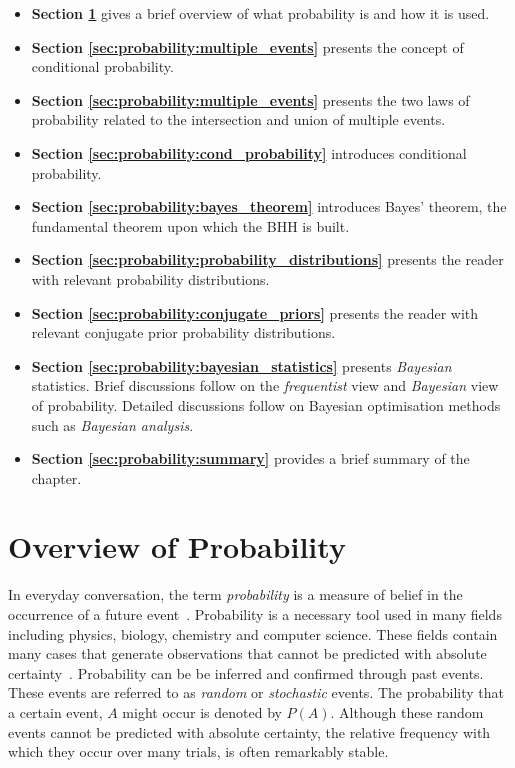 \begin{itemize}
      \item \textbf{Section \ref{sec:probability:overview}} gives a brief overview of what probability is and how it is used.

      \item \textbf{Section \ref{sec:probability:multiple_events}} presents the concept of conditional probability.

      \item \textbf{Section \ref{sec:probability:multiple_events}} presents the two laws of probability related to the intersection and union of multiple events.

      \item \textbf{Section \ref{sec:probability:cond_probability}} introduces conditional probability.

      \item \textbf{Section \ref{sec:probability:bayes_theorem}} introduces Bayes' theorem, the fundamental theorem upon which the \acs{BHH} is built.

      \item \textbf{Section \ref{sec:probability:probability_distributions}} presents the reader with relevant probability distributions.

      \item \textbf{Section \ref{sec:probability:conjugate_priors}} presents the reader with relevant conjugate prior probability distributions.

      \item \textbf{Section \ref{sec:probability:bayesian_statistics}} presents \textit{Bayesian} statistics. Brief discussions follow on the \textit{frequentist} view and \textit{Bayesian} view of probability. Detailed discussions follow on Bayesian optimisation methods such as \textit{Bayesian analysis}.

      \item \textbf{Section \ref{sec:probability:summary}} provides a brief summary of the chapter.
\end{itemize}


\section{Overview of Probability}\label{sec:probability:overview}

In everyday conversation, the term \textit{probability} is a measure of belief in the occurrence of a future event~\cite{ref:wackerly:2014}. Probability is a necessary tool used in many fields including physics, biology, chemistry and computer science. These fields contain many cases that generate observations that cannot be predicted with absolute certainty~\cite{ref:wackerly:2014}. Probability can be be inferred and confirmed through past events. These events are referred to as \textit{random} or \textit{stochastic} events. The probability that a certain event, $A$ might occur is denoted by $P(A)$. Although these random events cannot be predicted with absolute certainty, the relative frequency with which they occur over many trials, is often remarkably stable.

